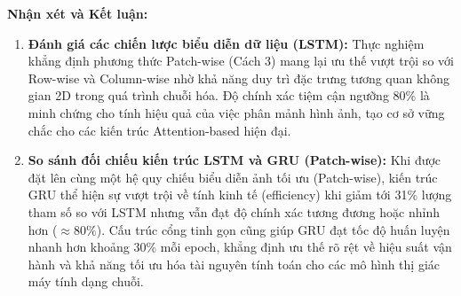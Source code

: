 \documentclass[12pt,a4paper]{article}
\numberwithin{figure}{section}
\numberwithin{table}{section}
\begin{document}
\textbf{Nhận xét và Kết luận:}
\begin{enumerate}
    \item \textbf{Đánh giá các chiến lược biểu diễn dữ liệu (LSTM):} Thực nghiệm khẳng định phương thức Patch-wise (Cách 3) mang lại ưu thế vượt trội so với Row-wise và Column-wise nhờ khả năng duy trì đặc trưng tương quan không gian 2D trong quá trình chuỗi hóa. Độ chính xác tiệm cận ngưỡng 80\% là minh chứng cho tính hiệu quả của việc phân mảnh hình ảnh, tạo cơ sở vững chắc cho các kiến trúc Attention-based hiện đại.
    \item \textbf{So sánh đối chiếu kiến trúc LSTM và GRU (Patch-wise):} Khi được đặt lên cùng một hệ quy chiếu biểu diễn ảnh tối ưu (Patch-wise), kiến trúc GRU thể hiện sự vượt trội về tính kinh tế (efficiency) khi giảm tới 31\% lượng tham số so với LSTM nhưng vẫn đạt độ chính xác tương đương hoặc nhỉnh hơn ($\approx 80\%$). Cấu trúc cổng tinh gọn cũng giúp GRU đạt tốc độ huấn luyện nhanh hơn khoảng 30\% mỗi epoch, khẳng định ưu thế rõ rệt về hiệu suất vận hành và khả năng tối ưu hóa tài nguyên tính toán cho các mô hình thị giác máy tính dạng chuỗi.
\end{enumerate}
\end{document}
